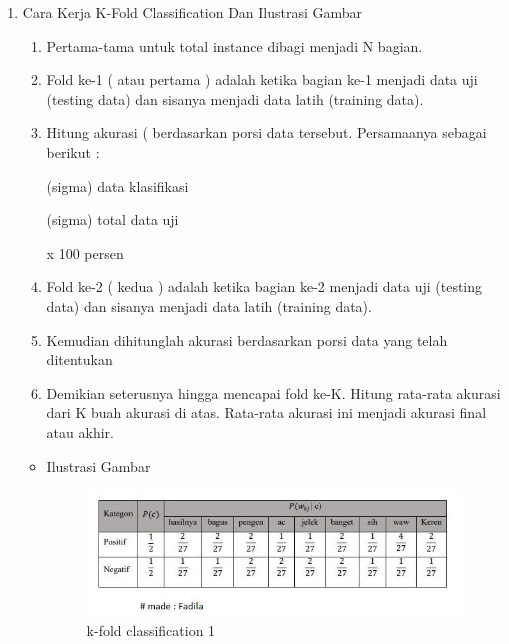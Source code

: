 \begin{enumerate}
\begin{itemize}
\begin{itemize}
\begin{enumerate}
\par
\end{enumerate}
\end{itemize}
\end{itemize}


\par
\item Cara Kerja K-Fold Classification Dan Ilustrasi Gambar
\begin{enumerate}
\item Pertama-tama untuk total instance dibagi menjadi N bagian.
\item Fold ke-1 ( atau pertama ) adalah ketika bagian ke-1 menjadi data uji (testing data) dan sisanya menjadi data latih (training data).
\item Hitung akurasi ( berdasarkan porsi data tersebut. Persamaanya sebagai berikut :
\par (sigma) data klasifikasi
\par (sigma) total data uji
\par x 100 persen 
\item Fold ke-2 ( kedua ) adalah ketika bagian ke-2 menjadi data uji (testing data) dan sisanya menjadi data latih (training data). 
\item Kemudian dihitunglah akurasi berdasarkan porsi data yang telah ditentukan
\item Demikian seterusnya hingga mencapai fold ke-K. Hitung rata-rata akurasi dari K buah akurasi di atas. Rata-rata akurasi ini menjadi akurasi final atau akhir.
\end{enumerate}
\par
\begin{itemize}
\item Ilustrasi Gambar
\par

\begin{figure}[ht]
\centering
\includegraphics[scale=0.4]{figures/hasilk1.jpg}
\caption{k-fold classification 1}
\label{contoh}
\end{figure}


\end{itemize}
\end{enumerate}
